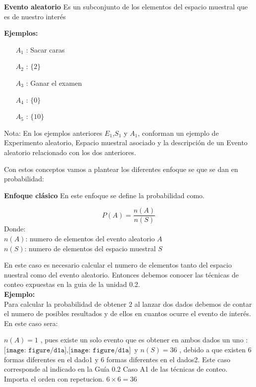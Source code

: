 \documentclass[base=hide,12pt]{elegantbook}
\begin{document}
\vspace{.5cm}
\begin{Box4}{\bf Evento aleatorio}
Es un subconjunto de los elementos del espacio muestral que es de nuestro interés	
\end{Box4}	
\textcolor{col3}{\bf Ejemplos: }
  \begin{itemize}
    \item[$A_{1}$]:  Sacar caras
    \item[$A_{2}$]: $\{2\}$
    \item[$A_{3}$]: Ganar el examen
    \item[$A_{4}$]: $\{0\}$
    \item[$A_{5}$]: $\{10\}$
  \end{itemize}
\vspace{.5cm}
\textcolor{col5}{Nota:} En los ejemplos anteriores $E_1$,$S_1$ y $A_1$, conforman un ejemplo de Experimento aleatorio, Espacio muestral asociado y la descripción de un Evento aleatorio relacionado con los dos anteriores.

Con estos conceptos vamos a plantear los diferentes enfoque se que se dan en probabilidad:
\vspace{.5cm}
\begin{Box4}{\large \bf Enfoque clásico}
En este enfoque se define la probabilidad como.

$$P(A)= \dfrac{n(A)}{n(S)} $$	
Donde:\\
$n(A)$: numero de  elementos del evento aleatorio $A$\\
$n(S)$: numero de elementos del espacio muestral $S$
\end{Box4}	

En este caso es necesario calcular el numero de elementos tanto del espacio nuestral como del evento aleatorio. Entonces debemos conocer las técnicas  de conteo expuestas en la guia de la unidad 0.2.\\

\textcolor{col3}{\bf Ejemplo: }\\
Para calcular la probabilidad de obtener $2$ al lanzar dos dados debemos de contar el numero de posibles resultados y de ellos en cuantos ocurre el evento de interés. En este caso sera:

$n(A)=1$ , pues existe un solo evento que es obtener en ambos dados un uno : \( \texttt{[image: figure/d1a]} , \texttt{[image: figure/d1a]}\) y $n(S)=36$ , debido a que existen  6 formas diferentes en el dado1 y 6 formas diferentes  en el dados2. Este caso corresponde al indicado en la Guía 0.2 Caso A1 de las técnicas de  conteo. Importa el orden con  repetucion. $6 \times 6 =36$
\end{document}
